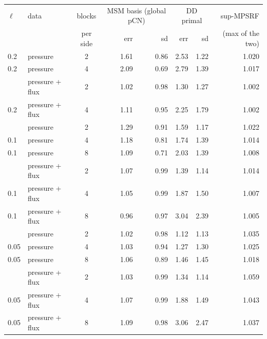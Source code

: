 \begin{tabular}{llcrrrrr}
\toprule
$\ell$ & data & blocks & \multicolumn{2}{c}{MSM basis (global pCN)} & \multicolumn{2}{c}{DD primal} & sup-MPSRF \\
 & & per side & err & sd & err & sd & (max of the two) \\
\midrule
0.2 & pressure & 2 & 1.61 & 0.86 & 2.53 & 1.22 & 1.020 \\
0.2 & pressure & 4 & 2.09 & 0.69 & 2.79 & 1.39 & 1.017 \\
\addlinespace
0.2 & pressure + flux & 2 & 1.02 & 0.98 & 1.30 & 1.27 & 1.002 \\
0.2 & pressure + flux & 4 & 1.11 & 0.95 & 2.25 & 1.79 & 1.002 \\
\addlinespace
0.1 & pressure & 2 & 1.29 & 0.91 & 1.59 & 1.17 & 1.022 \\
0.1 & pressure & 4 & 1.18 & 0.81 & 1.74 & 1.39 & 1.014 \\
0.1 & pressure & 8 & 1.09 & 0.71 & 2.03 & 1.39 & 1.008 \\
\addlinespace
0.1 & pressure + flux & 2 & 1.07 & 0.99 & 1.39 & 1.14 & 1.014 \\
0.1 & pressure + flux & 4 & 1.05 & 0.99 & 1.87 & 1.50 & 1.007 \\
0.1 & pressure + flux & 8 & 0.96 & 0.97 & 3.04 & 2.39 & 1.005 \\
\addlinespace
0.05 & pressure & 2 & 1.02 & 0.98 & 1.12 & 1.13 & 1.035 \\
0.05 & pressure & 4 & 1.03 & 0.94 & 1.27 & 1.30 & 1.025 \\
0.05 & pressure & 8 & 1.06 & 0.89 & 1.46 & 1.45 & 1.018 \\
\addlinespace
0.05 & pressure + flux & 2 & 1.03 & 0.99 & 1.34 & 1.14 & 1.059 \\
0.05 & pressure + flux & 4 & 1.07 & 0.99 & 1.88 & 1.49 & 1.043 \\
0.05 & pressure + flux & 8 & 1.09 & 0.98 & 3.06 & 2.47 & 1.037 \\
\bottomrule
\end{tabular}
